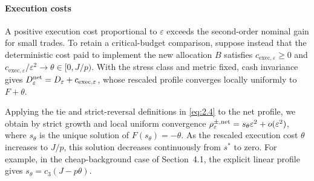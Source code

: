 \paragraph{Execution costs}\label{par:execution-costs} A positive execution cost proportional to \(\varepsilon\) exceeds the second-order nominal gain for small trades. To retain a critical-budget comparison, suppose instead that the deterministic cost paid to implement the new allocation \(B\) satisfies \(c_{\mathrm{exec},\varepsilon}\ge0\) and \(c_{\mathrm{exec},\varepsilon}/\varepsilon^2\to\theta\in[0,J/p)\). With the stress class and metric fixed, cash invariance gives \(D^{\rm net}_\varepsilon=D_\varepsilon+c_{\mathrm{exec},\varepsilon}\), whose rescaled profile converges locally uniformly to \(F+\theta\).

Applying the tie and strict-reversal definitions in \eqref{eq:2.4} to the net profile, we obtain by strict growth and local uniform convergence \(\rho^{\pm,\rm net}_\varepsilon=s_\theta\varepsilon^2+o(\varepsilon^2)\), where \(s_\theta\) is the unique solution of \(F(s_\theta)=-\theta\). As the rescaled execution cost \(\theta\) increases to \(J/p\), this solution decreases continuously from \(s^*\) to zero. For example, in the cheap-background case of Section~4.1, the explicit linear profile gives \(s_\theta=c_3(J-p\theta)\).
